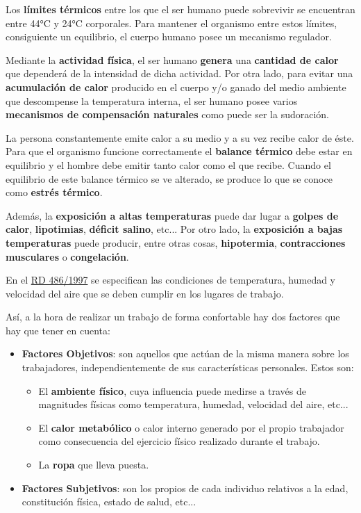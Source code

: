 Los \textbf{límites térmicos} entre los que el ser humano puede sobrevivir se encuentran entre 44°C y 24°C corporales. Para mantener el organismo entre estos límites, consiguiente un equilibrio, el cuerpo humano posee un mecanismo regulador.

Mediante la \textbf{actividad física}, el ser humano \textbf{genera} una \textbf{cantidad de calor} que dependerá de la intensidad de dicha actividad. Por otra lado, para evitar una \textbf{acumulación de calor} producido en el cuerpo y/o ganado del medio ambiente que descompense la temperatura interna, el ser humano posee varios \textbf{mecanismos de compensación naturales} como puede ser la sudoración.

La persona constantemente emite calor a su medio y a su vez recibe calor de éste. Para que el organismo funcione correctamente el \textbf{balance térmico} debe estar en equilibrio y el hombre debe emitir tanto calor como el que recibe. Cuando el equilibrio de este balance térmico se ve alterado, se produce lo que se conoce como \textbf{estrés térmico}.

Además, la \textbf{exposición a altas temperaturas} puede dar lugar a \textbf{golpes de calor}, \textbf{lipotimias}, \textbf{déficit salino}, etc... Por otro lado, la \textbf{exposición a bajas temperaturas} puede producir, entre otras cosas, \textbf{hipotermia}, \textbf{contracciones musculares} o \textbf{congelación}.

En el \href{https://precoinprevencion.com/wp-content/uploads/2015/03/Guia-T%C3%A9cnica-Lugares-Trabajo-RD-486-Revisi%C3%B3n.pdf}{RD 486/1997} se especifican las condiciones de temperatura, humedad y velocidad del aire que se deben cumplir en los lugares de trabajo.

Así, a la hora de realizar un trabajo de forma confortable hay dos factores que hay que tener en cuenta:

\begin{itemize}
    \item \textbf{Factores Objetivos}: son aquellos que actúan de la misma manera sobre los trabajadores, independientemente de sus características personales. Estos son:
    \begin{itemize}
        \item El \textbf{ambiente físico}, cuya influencia puede medirse a través de magnitudes físicas como temperatura, humedad, velocidad del aire, etc...
        \item El \textbf{calor metabólico} o calor interno generado por el propio trabajador como consecuencia del ejercicio físico realizado durante el trabajo.
        \item La \textbf{ropa} que lleva puesta.
    \end{itemize}

    \item \textbf{Factores Subjetivos}: son los propios de cada individuo relativos a la edad, constitución física, estado de salud, etc...
\end{itemize}


